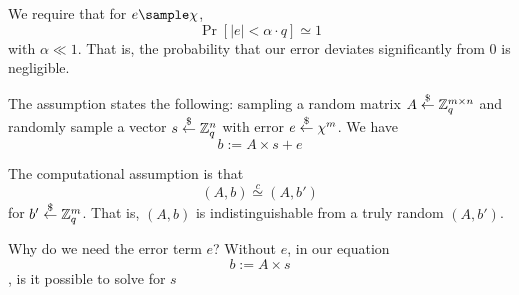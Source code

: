 
We require that for $e\sample \chi$, 
\[\Pr[|e| < \alpha\cdot q ]\simeq 1\]
with $\alpha \ll 1$. That is, the probability that our error deviates significantly from $0$ is negligible.

The assumption states the following: sampling a random matrix $A\overset{\$}{\leftarrow} \mathbb Z_q^{m\times n}$ and randomly sample a vector $s\overset{\$}{\leftarrow} \mathbb Z_q^n$ with error $e\overset{\$}{\leftarrow} \chi^m$. We have \[b:=A\times s + e\]

The computational assumption is that
\[(A, b)\overset{c}{\simeq} (A, b')\]
for $b'\overset{\$}{\leftarrow} \mathbb Z_q^m$. That is, $(A, b)$ is indistinguishable from a truly random $(A, b')$.

Why do we need the error term $e$? Without $e$, in our equation \[b:=A\times s\], is it possible to solve for $s$